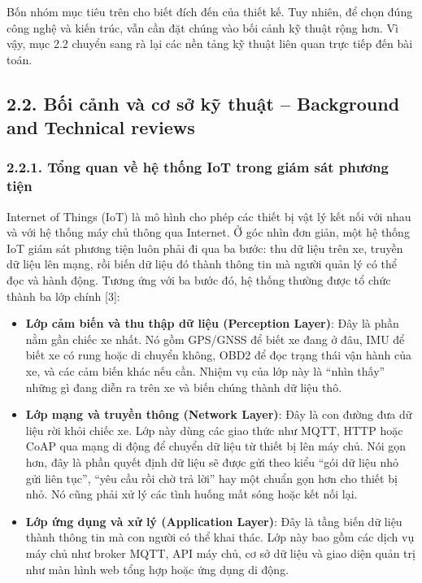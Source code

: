 \documentclass[a4paper]{extarticle}
\providecommand{\tightlist}{%
  \setlength{\itemsep}{0pt}\setlength{\parskip}{0pt}}
\begin{document}
Bốn nhóm mục tiêu trên cho biết đích đến của thiết kế. Tuy nhiên, để
chọn đúng công nghệ và kiến trúc, vẫn cần đặt chúng vào bối cảnh kỹ
thuật rộng hơn. Vì vậy, mục 2.2 chuyển sang rà lại các nền tảng kỹ thuật
liên quan trực tiếp đến bài toán.

\subsection{2.2. Bối cảnh và cơ sở kỹ thuật -- Background and Technical
reviews}\label{22-bux1ed1i-cux1ea3nh-vuxe0-cux1a1-sux1edf-kux1ef9-thuux1eadt--background-and-technical-reviews}

\subsubsection{2.2.1. Tổng quan về hệ thống IoT trong giám sát phương
tiện}\label{221-tux1ed5ng-quan-vux1ec1-hux1ec7-thux1ed1ng-iot-trong-giuxe1m-suxe1t-phux1b0ux1a1ng-tiux1ec7n}

Internet of Things (IoT) là mô hình cho phép các thiết bị vật lý kết nối
với nhau và với hệ thống máy chủ thông qua Internet. Ở góc nhìn đơn giản,
một hệ thống IoT giám sát phương tiện luôn phải đi qua ba bước: thu dữ
liệu trên xe, truyền dữ liệu lên mạng, rồi biến dữ liệu đó thành thông
tin mà người quản lý có thể đọc và hành động. Tương ứng với ba bước đó,
hệ thống thường được tổ chức thành ba lớp chính {[}3{]}:

\begin{itemize}
\tightlist
\item
  \textbf{Lớp cảm biến và thu thập dữ liệu (Perception Layer)}: Đây là
  phần nằm gần chiếc xe nhất. Nó gồm GPS/GNSS để biết xe đang ở đâu, IMU
  để biết xe có rung hoặc di chuyển không, OBD2 để đọc trạng thái vận
  hành của xe, và các cảm biến khác nếu cần. Nhiệm vụ của lớp này là
  ``nhìn thấy'' những gì đang diễn ra trên xe và biến chúng thành dữ
  liệu thô.
\item
  \textbf{Lớp mạng và truyền thông (Network Layer)}: Đây là con đường
  đưa dữ liệu rời khỏi chiếc xe. Lớp này dùng các giao thức như MQTT,
  HTTP hoặc CoAP qua mạng di động để chuyển dữ liệu từ thiết bị lên máy
  chủ. Nói gọn hơn, đây là phần quyết định dữ liệu sẽ được gửi theo kiểu
  ``gói dữ liệu nhỏ gửi liên tục'', ``yêu cầu rồi chờ trả lời'' hay một chuẩn
  gọn hơn cho thiết bị nhỏ. Nó cũng phải xử lý các tình huống mất sóng
  hoặc kết nối lại.
\item
  \textbf{Lớp ứng dụng và xử lý (Application Layer)}: Đây là tầng biến dữ
  liệu thành thông tin mà con người có thể khai thác. Lớp này bao gồm
  các dịch vụ máy chủ như broker MQTT, API máy chủ, cơ sở dữ liệu và
  giao diện quản trị như màn hình web tổng hợp hoặc ứng dụng di động.
\end{itemize}
\end{document}
